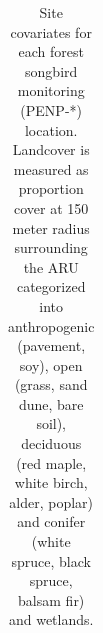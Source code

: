 \documentclass[
  letterpaper,
  DIV=11,
  numbers=noendperiod]{scrartcl}
\begin{document}
\begin{longtable}[]{@{}
  >{\raggedright\arraybackslash}p{}
  >{\raggedleft\arraybackslash}p{}
  >{\raggedleft\arraybackslash}p{}
  >{\raggedleft\arraybackslash}p{}
  >{\raggedleft\arraybackslash}p{}
  >{\raggedleft\arraybackslash}p{}
  >{\raggedleft\arraybackslash}p{}
  >{\raggedleft\arraybackslash}p{}@{}}

\caption{\label{tbl-obvs-and-covs}Site covariates for each forest
songbird monitoring (PENP-*) location. Landcover is measured as
proportion cover at 150 meter radius surrounding the ARU categorized
into anthropogenic (pavement, soy), open (grass, sand dune, bare soil),
deciduous (red maple, white birch, alder, poplar) and conifer (white
spruce, black spruce, balsam fir) and wetlands.}

\tabularnewline


\end{longtable}
\end{document}
